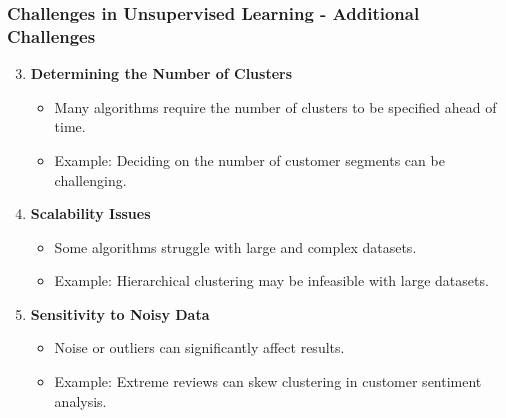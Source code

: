 \documentclass[aspectratio=169]{beamer}
\begin{document}
\begin{frame}[fragile]
    \frametitle{Challenges in Unsupervised Learning - Additional Challenges}
    \begin{enumerate}
        \setcounter{enumi}{2} %
        \item \textbf{Determining the Number of Clusters}
            \begin{itemize}
                \item Many algorithms require the number of clusters to be specified ahead of time.
                \item Example: Deciding on the number of customer segments can be challenging.
            \end{itemize}

        \item \textbf{Scalability Issues}
            \begin{itemize}
                \item Some algorithms struggle with large and complex datasets.
                \item Example: Hierarchical clustering may be infeasible with large datasets.
            \end{itemize}

        \item \textbf{Sensitivity to Noisy Data}
            \begin{itemize}
                \item Noise or outliers can significantly affect results.
                \item Example: Extreme reviews can skew clustering in customer sentiment analysis.
            \end{itemize}
    \end{enumerate}
\end{frame}
\end{document}
